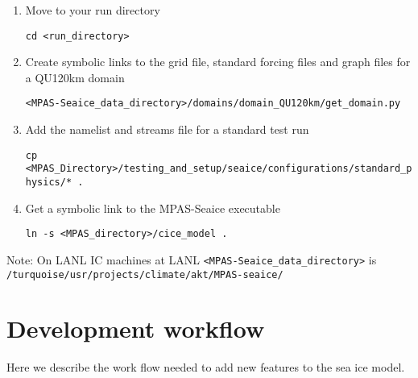 \documentclass{article}
\begin{document}
\begin{enumerate}

\item Move to your run directory

\verb+cd <run_directory>+

\item Create symbolic links to the grid file, standard forcing files and graph files for a QU120km domain

\verb+<MPAS-Seaice_data_directory>/domains/domain_QU120km/get_domain.py+

\item Add the namelist and streams file for a standard test run

\verb+cp <MPAS_Directory>/testing_and_setup/seaice/configurations/standard_physics/* .+

\item Get a symbolic link to the MPAS-Seaice executable

\verb+ln -s <MPAS_directory>/cice_model .+

\end{enumerate}

Note: On LANL IC machines at LANL \verb+<MPAS-Seaice_data_directory>+ is \verb+/turquoise/usr/projects/climate/akt/MPAS-seaice/+


\section{Development workflow}
\label{sec:development}

Here we describe the work flow needed to add new features to the sea ice model.
\end{document}
